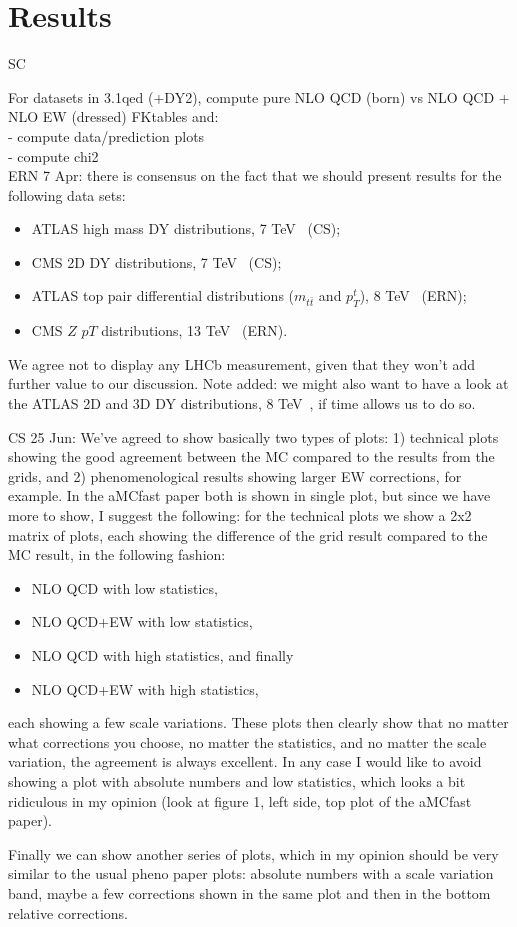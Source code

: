 \section{Results}
\label{sec:results}

SC

For datasets in 3.1qed (+DY2), compute pure NLO QCD (born) vs NLO QCD + NLO EW (dressed) FKtables and:\\
- compute data/prediction plots\\
- compute chi2\\

ERN 7 Apr: there is consensus on the fact that we should present results for the
following data sets:
\begin{itemize}
\item ATLAS high mass DY distributions, 7 TeV~\cite{Aad:2013iua} (CS);
\item CMS 2D DY distributions, 7 TeV~\cite{Chatrchyan:2013tia} (CS);
\item ATLAS top pair differential distributions ($m_{t\bar{t}}$ and $p_T^t$), 
8 TeV~\cite{Aad:2015mbv} (ERN);
\item CMS $Z$ $pT$ distributions, 13 TeV~\cite{Sirunyan:2019bzr} (ERN).
\end{itemize}

We agree not to display any LHCb measurement, given that they won't add
further value to our discussion.
Note added: we might also want to have a look at the ATLAS 2D and 3D DY 
distributions, 8 TeV~\cite{Aad:2016zzw,Aaboud:2017ffb}, if time allows 
us to do so.

CS 25 Jun: We've agreed to show basically two types of plots: 1) technical plots showing the good agreement between the MC compared to the results from the grids, and 2) phenomenological results showing larger EW corrections, for example.
In the aMCfast paper both is shown in single plot, but since we have more to show, I suggest the following: for the technical plots we show a 2x2 matrix of plots, each showing the difference of the grid result compared to the MC result, in the following fashion:
\begin{itemize}
\item NLO QCD with low statistics,
\item NLO QCD+EW with low statistics,
\item NLO QCD with high statistics, and finally
\item NLO QCD+EW with high statistics,
\end{itemize}
each showing a few scale variations.
These plots then clearly show that no matter what corrections you choose, no matter the statistics, and no matter the scale variation, the agreement is always excellent.
In any case I would like to avoid showing a plot with absolute numbers and low statistics, which looks a bit ridiculous in my opinion (look at figure 1, left side, top plot of the aMCfast paper).

Finally we can show another series of plots, which in my opinion should be very similar to the usual pheno paper plots: absolute numbers with a scale variation band, maybe a few corrections shown in the same plot and then in the bottom relative corrections.
